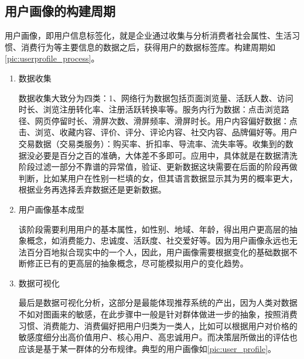 		\subsection{用户画像的构建周期}
		用户画像，即用户信息标签化，就是企业通过收集与分析消费者社会属性、生活习惯、消费行为等主要信息的数据之后，获得用户的数据标签库。构建周期如\autoref{pic:userprofile_process}。
		\begin{figure}
	    \centering
	      \label{pic:userprofile_process}
	    \end{figure}
	    \begin{enumerate}[(1)]
	    \item 数据收集

	    数据收集大致分为四类：1、网络行为数据包括页面浏览量、活跃人数、访问时长、浏览注册转化率、注册活跃转换率等。服务内行为数据：点击浏览路径、网页停留时长、滑屏次数、滑屏频率、滑屏时长。用户内容偏好数据：点击、浏览、收藏内容、评价、评分、评论内容、社交内容、品牌偏好等。用户交易数据（交易类服务）：购买率、折扣率、导流率、流失率等。收集到的数据没必要是百分之百的准确，大体差不多即可。应用中，具体就是在数据清洗阶段过滤一部分不靠谱的异常值，验证、更新数据这块需要在后面的阶段再做判断，比如某用户在性别一栏填的女，但其语言数据显示其为男的概率更大，根据业务再选择丢弃数据还是更新数据。
	    
	    \item 用户画像基本成型

	    该阶段需要利用用户的基本属性，如性别、地域、年龄，得出用户更高层的抽象概念，如消费能力、忠诚度、活跃度、社交爱好等。因为用户画像永远也无法百分百地拟合现实中的一个人，因此，用户画像需要根据变化的基础数据不断修正已有的更高层的抽象概念，尽可能模拟用户的变化趋势。

	    \item 数据可视化

	    最后是数据可视化分析，这部分是最能体现推荐系统的产出，因为人类对数据不如对图画来的敏感，在此步骤中一般是针对群体做进一步的抽象，按照消费习惯、消费能力、消费偏好把用户归类为一类人，比如可以根据用户对价格的敏感度细分出高价值用户、核心用户、高忠诚用户。而决策层所做出的评估也应该是基于某一群体的分布规律。典型的用户画像如\autoref{pic:user_profile}。
	    \end{enumerate}
